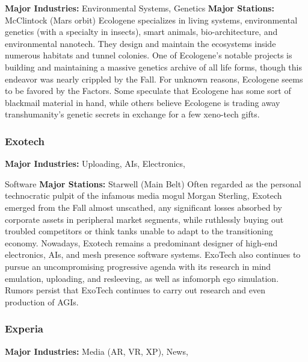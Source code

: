 \textbf{Major Industries:} Environmental Systems, Genetics
\textbf{Major Stations:} McClintock (Mars orbit)
Ecologene specializes in living systems, environmental 
genetics (with a specialty in insects), smart animals, 
bio-architecture, and environmental nanotech. They 
design and maintain the ecosystems inside numerous 
habitats and tunnel colonies. One of Ecologene's notable projects is building and maintaining a massive 
genetics archive of all life forms, though this endeavor 
was nearly crippled by the Fall. For unknown reasons, 
Ecologene seems to be favored by the Factors. Some 
speculate that Ecologene has some sort of blackmail 
material in hand, while others believe Ecologene is 
trading away transhumanity's genetic secrets in exchange for a few xeno-tech gifts.

\subsubsection{Exotech}

\textbf{Major Industries:} Uploading, AIs, Electronics, 

Software
\textbf{Major Stations:} Starwell (Main Belt)
Often regarded as the personal technocratic pulpit of 
the infamous media mogul Morgan Sterling, Exotech 
emerged from the Fall almost unscathed, any significant losses absorbed by corporate assets in peripheral 
market segments, while ruthlessly buying out troubled 
competitors or think tanks unable to adapt to the 
transitioning economy. Nowadays, Exotech remains a 
predominant designer of high-end electronics, AIs, and 
mesh presence software systems. ExoTech also continues to pursue an uncompromising progressive agenda 
with its research in mind emulation, uploading, and 
resleeving, as well as infomorph ego simulation. 
Rumors persist that ExoTech continues to carry out 
research and even production of AGIs.

\subsubsection{Experia}

\textbf{Major Industries:} Media (AR, VR, XP), News, 

